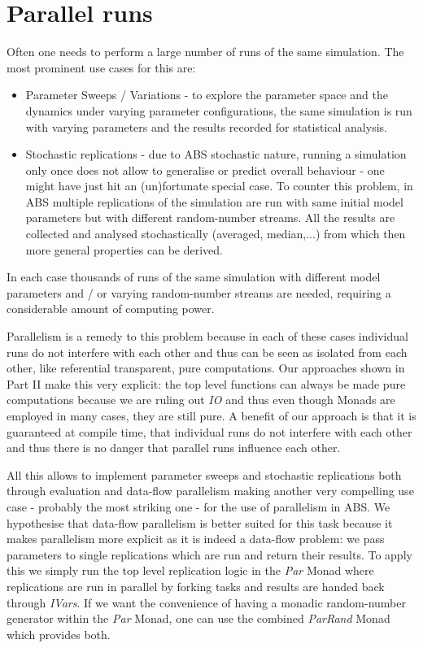 \section{Parallel runs}
Often one needs to perform a large number of runs of the same simulation. The most prominent use cases for this are:

\begin{itemize}
	\item Parameter Sweeps / Variations - to explore the parameter space and the dynamics under varying parameter configurations, the same simulation is run with varying parameters and the results recorded for statistical analysis.
	
	\item Stochastic replications - due to ABS stochastic nature, running a simulation only once does not allow to generalise or predict overall behaviour - one might have just hit an (un)fortunate special case. To counter this problem, in ABS multiple replications of the  simulation are run with same initial model parameters but with different random-number streams. All the results are collected and analysed stochastically (averaged, median,...) from which then more general properties can be derived.
\end{itemize}

In each case thousands of runs of the same simulation with different model parameters and / or varying random-number streams are needed, requiring a considerable amount of computing power.

Parallelism is a remedy to this problem because in each of these cases individual runs do not interfere with each other and thus can be seen as isolated from each other, like referential transparent, pure computations. Our approaches shown in Part II make this very explicit: the top level functions can always be made pure computations because we are ruling out \textit{IO} and thus even though Monads are employed in many cases, they are still pure. A benefit of our approach is that it is guaranteed at compile time, that individual runs do not interfere with each other and thus there is no danger that parallel runs influence each other. 

All this allows to implement parameter sweeps and stochastic replications both through evaluation and data-flow parallelism making another very compelling use case - probably the most striking one - for the use of parallelism in ABS. We hypothesise that data-flow parallelism is better suited for this task because it makes parallelism more explicit as it is indeed a data-flow problem: we pass parameters to single replications which are run and return their results. To apply this we simply run the top level replication logic in the \textit{Par} Monad where replications are run in parallel by forking tasks and results are handed back through \textit{IVars}. If we want the convenience of having a monadic random-number generator within the \textit{Par} Monad, one can use the combined \textit{ParRand} Monad which provides both.